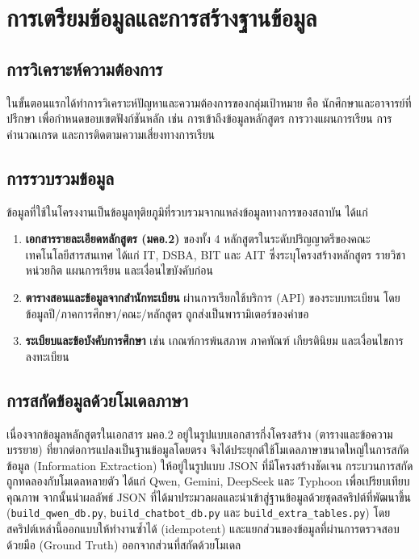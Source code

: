 \section{การเตรียมข้อมูลและการสร้างฐานข้อมูล}

\subsection{การวิเคราะห์ความต้องการ}

ในขั้นตอนแรกได้ทำการวิเคราะห์ปัญหาและความต้องการของกลุ่มเป้าหมาย คือ นักศึกษาและอาจารย์ที่ปรึกษา เพื่อกำหนดขอบเขตฟังก์ชันหลัก เช่น การเข้าถึงข้อมูลหลักสูตร การวางแผนการเรียน การคำนวณเกรด และการติดตามความเสี่ยงทางการเรียน

\subsection{การรวบรวมข้อมูล}

ข้อมูลที่ใช้ในโครงงานเป็นข้อมูลทุติยภูมิที่รวบรวมจากแหล่งข้อมูลทางการของสถาบัน ได้แก่

\begin{enumerate}
    \item \textbf{เอกสารรายละเอียดหลักสูตร (มคอ.2)} ของทั้ง 4 หลักสูตรในระดับปริญญาตรีของคณะเทคโนโลยีสารสนเทศ ได้แก่ IT, DSBA, BIT และ AIT ซึ่งระบุโครงสร้างหลักสูตร รายวิชา หน่วยกิต แผนการเรียน และเงื่อนไขบังคับก่อน
    \item \textbf{ตารางสอนและข้อมูลจากสำนักทะเบียน} ผ่านการเรียกใช้บริการ (API) ของระบบทะเบียน โดยข้อมูลปี/ภาคการศึกษา/คณะ/หลักสูตร ถูกส่งเป็นพารามิเตอร์ของคำขอ
    \item \textbf{ระเบียบและข้อบังคับการศึกษา} เช่น เกณฑ์การพ้นสภาพ ภาคทัณฑ์ เกียรตินิยม และเงื่อนไขการลงทะเบียน
\end{enumerate}

\subsection{การสกัดข้อมูลด้วยโมเดลภาษา}

เนื่องจากข้อมูลหลักสูตรในเอกสาร มคอ.2 อยู่ในรูปแบบเอกสารกึ่งโครงสร้าง (ตารางและข้อความบรรยาย) ที่ยากต่อการแปลงเป็นฐานข้อมูลโดยตรง จึงได้ประยุกต์ใช้โมเดลภาษาขนาดใหญ่ในการสกัดข้อมูล (Information Extraction) ให้อยู่ในรูปแบบ JSON ที่มีโครงสร้างชัดเจน กระบวนการสกัดถูกทดลองกับโมเดลหลายตัว ได้แก่ Qwen, Gemini, DeepSeek และ Typhoon เพื่อเปรียบเทียบคุณภาพ จากนั้นนำผลลัพธ์ JSON ที่ได้มาประมวลผลและนำเข้าสู่ฐานข้อมูลด้วยชุดสคริปต์ที่พัฒนาขึ้น (\texttt{build\_qwen\_db.py}, \texttt{build\_chatbot\_db.py} และ \texttt{build\_extra\_tables.py}) โดยสคริปต์เหล่านี้ออกแบบให้ทำงานซ้ำได้ (idempotent) และแยกส่วนของข้อมูลที่ผ่านการตรวจสอบด้วยมือ (Ground Truth) ออกจากส่วนที่สกัดด้วยโมเดล

